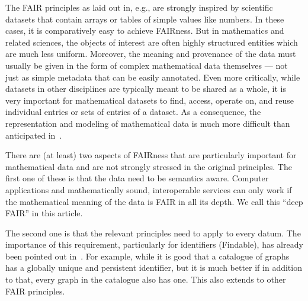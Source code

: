 The FAIR principles as laid out in, e.g., \cite{WilDumAal:FAIR16} are strongly inspired by scientific datasets that contain arrays or tables of simple values like numbers.
In these cases, it is comparatively easy to achieve FAIRness.
But in mathematics and related sciences, the objects of interest are often highly structured entities which are much less uniform.
Moreover, the meaning and provenance of the data must usually be given in the form of complex mathematical data themselves --- not just as simple metadata that can be easily annotated.
Even more critically, while datasets in other disciplines are typically meant to be shared as a whole, it is very important for mathematical datasets to find, access, operate on, and reuse individual entries or sets of entries of a dataset.
As a consequence, the representation and modeling of mathematical data is much more difficult than anticipated in~\cite{WilDumAal:FAIR16}.

There are (at least) two aspects of FAIRness that are particularly important for mathematical data and 
are not strongly stressed in the original principles.
The first one of these is that the data need to be semantics aware.
Computer applications and mathematically sound, interoperable services
can only work if the mathematical meaning of the data is FAIR in all its depth.
We call this ``deep FAIR'' in this article.


The second one is that the relevant principles need to apply to every datum.
The importance of this requirement, particularly for identifiers (Findable),
has already been pointed out in~\cite{BilTen:fingerprint13}.
For example, while it is good that a catalogue of graphs has a globally unique and persistent identifier,
but it is much better if in addition to that, every graph in the catalogue also has one.
This also extends to other FAIR principles.



